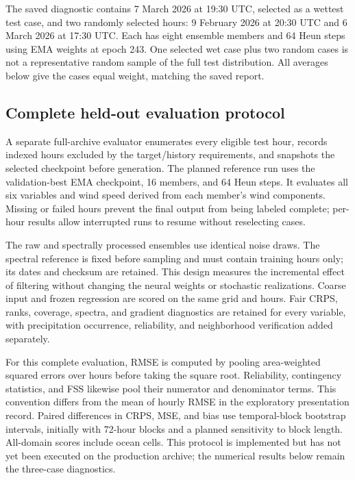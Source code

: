 \documentclass[10pt]{article}
\begin{document}
The saved diagnostic contains 7 March 2026 at 19:30 UTC, selected as a wettest test case, and two randomly selected hours: 9 February 2026 at 20:30 UTC and 6 March 2026 at 17:30 UTC. Each has eight ensemble members and 64 Heun steps using EMA weights at epoch 243. One selected wet case plus two random cases is not a representative random sample of the full test distribution. All averages below give the cases equal weight, matching the saved report.

\subsection{Complete held-out evaluation protocol}\label{sec:fulltest}
A separate full-archive evaluator enumerates every eligible test hour, records indexed hours excluded by the target/history requirements, and snapshots the selected checkpoint before generation. The planned reference run uses the validation-best EMA checkpoint, 16 members, and 64 Heun steps. It evaluates all six variables and wind speed derived from each member's wind components. Missing or failed hours prevent the final output from being labeled complete; per-hour results allow interrupted runs to resume without reselecting cases.

The raw and spectrally processed ensembles use identical noise draws. The spectral reference is fixed before sampling and must contain training hours only; its dates and checksum are retained. This design measures the incremental effect of filtering without changing the neural weights or stochastic realizations. Coarse input and frozen regression are scored on the same grid and hours. Fair CRPS, ranks, coverage, spectra, and gradient diagnostics are retained for every variable, with precipitation occurrence, reliability, and neighborhood verification added separately.

For this complete evaluation, RMSE is computed by pooling area-weighted squared errors over hours before taking the square root. Reliability, contingency statistics, and FSS likewise pool their numerator and denominator terms. This convention differs from the mean of hourly RMSE in the exploratory presentation record. Paired differences in CRPS, MSE, and bias use temporal-block bootstrap intervals, initially with 72-hour blocks and a planned sensitivity to block length. All-domain scores include ocean cells. This protocol is implemented but has not yet been executed on the production archive; the numerical results below remain the three-case diagnostics.
\end{document}
